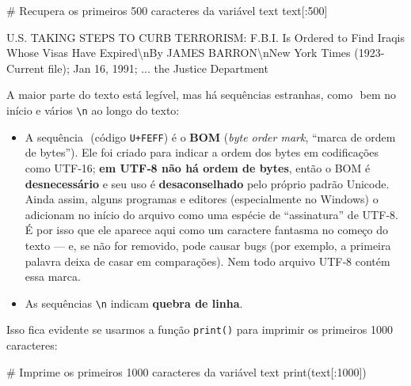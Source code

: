 \documentclass[
  brazilian,
  11pt,
]{article}
\newenvironment{Shaded}{\begin{snugshade}}{\end{snugshade}}
\newcommand{\BuiltInTok}[1]{\textcolor[rgb]{0.50,0.55,0.55}{#1}}
\newcommand{\CommentTok}[1]{\textcolor[rgb]{0.48,0.49,0.49}{#1}}
\newcommand{\DecValTok}[1]{\textcolor[rgb]{0.96,0.45,0.00}{#1}}
\newcommand{\NormalTok}[1]{\textcolor[rgb]{0.81,0.81,0.76}{#1}}
\providecommand{\tightlist}{%
  \setlength{\itemsep}{0pt}\setlength{\parskip}{0pt}}
\let\oldtexttt\texttt
\renewcommand{\texttt}[1]{{\color{inlink}\oldtexttt{#1}}}
\begin{document}
\begin{Shaded}
\begin{Highlighting}[]
\CommentTok{\# Recupera os primeiros 500 caracteres da variável \textquotesingle{}text\textquotesingle{}}
\NormalTok{text[:}\DecValTok{500}\NormalTok{]}
\end{Highlighting}
\end{Shaded}

\begin{Shaded}
\begin{Highlighting}[]
\NormalTok{\textquotesingle{}﻿U.S. TAKING STEPS TO CURB TERRORISM: F.B.I. Is Ordered to Find Iraqis Whose Visas Have Expired\textbackslash{}nBy JAMES BARRON\textbackslash{}nNew York Times (1923{-}Current file); Jan 16, 1991; ... the Justice Department\textquotesingle{}}
\end{Highlighting}
\end{Shaded}

A maior parte do texto está legível, mas há sequências estranhas, como
\texttt{﻿} bem no início e vários \texttt{\textbackslash{}n} ao longo do
texto:

\begin{itemize}
\tightlist
\item
  A sequência \texttt{﻿} (código \texttt{U+FEFF}) é o \textbf{BOM}
  (\emph{byte order mark}, ``marca de ordem de bytes''). Ele foi criado
  para indicar a ordem dos bytes em codificações como UTF‑16; \textbf{em
  UTF‑8 não há ordem de bytes}, então o BOM é \textbf{desnecessário} e
  seu uso é \textbf{desaconselhado} pelo próprio padrão Unicode. Ainda
  assim, alguns programas e editores (especialmente no Windows) o
  adicionam no início do arquivo como uma espécie de ``assinatura'' de
  UTF‑8. É por isso que ele aparece aqui como um caractere fantasma no
  começo do texto --- e, se não for removido, pode causar bugs (por
  exemplo, a primeira palavra deixa de casar em comparações). Nem todo
  arquivo UTF‑8 contém essa marca.
\item
  As sequências \texttt{\textbackslash{}n} indicam \textbf{quebra de
  linha}.
\end{itemize}

Isso fica evidente se usarmos a função \texttt{print()} para imprimir os
primeiros 1000 caracteres:

\begin{Shaded}
\begin{Highlighting}[]
\CommentTok{\# Imprime os primeiros 1000 caracteres da variável \textquotesingle{}text\textquotesingle{}}
\BuiltInTok{print}\NormalTok{(text[:}\DecValTok{1000}\NormalTok{])}
\end{Highlighting}
\end{Shaded}
\end{document}
